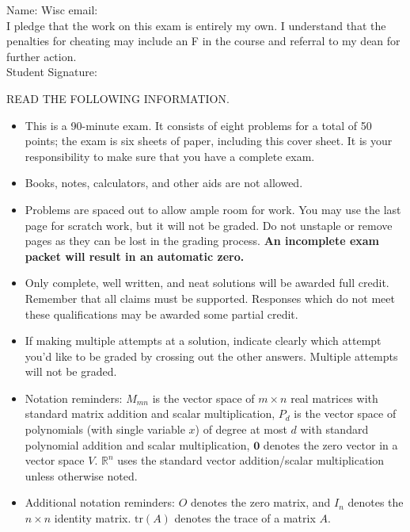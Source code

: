 \documentclass[12pt]{extarticle}
\begin{document}
\begin{framed}
\vspace*{.2in}
Name:   Wisc email:  \vspace*{.05in} \\
I pledge that the work on this exam is entirely my own. I understand that the penalties for cheating may include an F in the course and referral to my dean for further action.
 \vspace*{.2in} \\
Student Signature: 
\end{framed}
READ THE FOLLOWING INFORMATION.
\begin{itemize}
    \item This is a 90-minute exam. It consists of eight problems for a total of 50 points; the exam is six sheets of paper, including this cover sheet. It is your responsibility to make sure that you have a complete exam.\vspace{-0.2cm}

    \item Books, notes, calculators, and other aids are not allowed.\vspace{-0.2cm}
    \item Problems are spaced out to allow ample room for work. You may use the last page for scratch work, but it will not be graded. Do not unstaple or remove pages as they can be lost in the grading process.  \textbf{An incomplete exam packet will result in an automatic zero.}  \vspace{-0.2cm}
    \item Only complete, well written, and neat solutions will be awarded full credit. Remember that all claims must be supported. Responses which do not meet these qualifications may be awarded some partial credit.\vspace{-0.2cm}
    \item  If making multiple attempts at a solution, indicate clearly which attempt you'd like to be graded by crossing out the other answers. Multiple attempts will not be graded.
 \vspace{-0.2cm} 
        \item Notation reminders: $M_{mn}$ is the vector space of $m\times n$ real matrices with standard matrix addition and scalar multiplication, $P_d$ is the vector space of polynomials (with single variable $x$) of degree at most $d$ with standard polynomial addition and scalar multiplication, $\mathbf{0}$ denotes the zero vector in a vector space $V$. $\mathbb{R}^n$ uses the standard vector addition/scalar multiplication unless otherwise noted.
        \item Additional notation reminders: $O$ denotes the zero matrix, and $I_n$ denotes the $n\times n$ identity matrix. $\text{tr}(A)$ denotes the trace of a matrix $A$.
\end{itemize}
\end{document}
